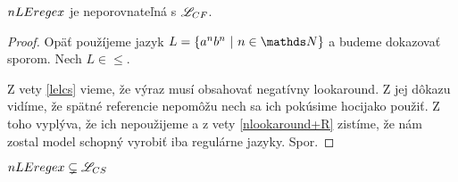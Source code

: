 \begin{veta}
$nLEregex$ je neporovnateľná s $ \mathscr{L}_{CF}$.
\end{veta}
\begin{proof}
Opäť použíjeme jazyk $L=\lbrace a^nb^n~|~n \in \N \rbrace$ a budeme dokazovať sporom. Nech $L \in \le$.

Z vety \ref{lelcs} vieme, že výraz musí obsahovať negatívny lookaround. Z jej dôkazu vidíme, že spätné referencie nepomôžu nech sa ich pokúsime hocijako použiť. Z toho vyplýva, že ich nepoužijeme a z vety \ref{nlookaround+R} zistíme, že nám zostal model schopný vyrobiť iba regulárne jazyky. Spor.
\end{proof}

\begin{dosledok}
$nLEregex \subsetneq \mathscr{L}_{CS}$
\end{dosledok}

